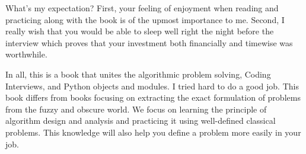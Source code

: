 \documentclass[../main.tex]{subfiles}
\begin{document}
What's my expectation? First, your feeling of enjoyment when reading and practicing along with the book is of the upmost importance to me. Second, I really wish that you would be able to sleep well right the night before the interview which proves that your investment both financially and timewise was worthwhile.


In all, this is a book that unites the algorithmic problem solving, Coding Interviews, and Python objects and modules. I tried hard to do a good job. This book differs from books focusing on extracting the exact formulation of problems from the fuzzy and obscure world. We focus on learning the principle of algorithm design and analysis and practicing it using well-defined classical problems. This knowledge will also help you define a problem more easily in your  job. 
\end{document}
